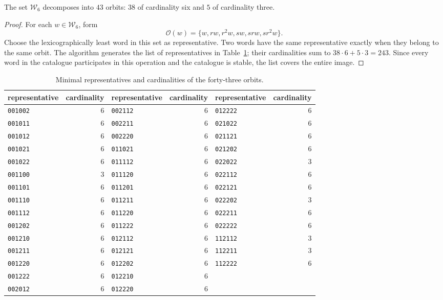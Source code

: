 \begin{proposition}
\label{act21:tpk:43}
The set \(\mathcal W_6\) decomposes into \(43\) orbits: \(38\) of
cardinality six and \(5\) of cardinality three.
\end{proposition}
\begin{proof}
For each \(w\in\mathcal W_6\), form
\[
 \mathcal O(w)=\{w,rw,r^2w,sw,srw,sr^2w\}.
\]
Choose the lexicographically least word in this set as representative.
Two words have the same representative exactly when they belong to the
same orbit. The algorithm generates the list of representatives in
Table~\ref{act21:tpk:representantes}; their cardinalities sum to
\(38\cdot6+5\cdot3=243\). Since every word in the catalogue participates
in this operation and the catalogue is stable, the list covers the
entire image.
\end{proof}

\begin{table}[htbp]
\caption{Minimal representatives and cardinalities of the forty-three orbits.}
\label{act21:tpk:representantes}
\small
\begin{tabular}{@{}lr@{\qquad}lr@{\qquad}lr@{}}
\toprule
representative&cardinality&representative&cardinality&representative&cardinality\\
\midrule
\texttt{001002}&6&\texttt{002112}&6&\texttt{012222}&6\\
\texttt{001011}&6&\texttt{002211}&6&\texttt{021022}&6\\
\texttt{001012}&6&\texttt{002220}&6&\texttt{021121}&6\\
\texttt{001021}&6&\texttt{011021}&6&\texttt{021202}&6\\
\texttt{001022}&6&\texttt{011112}&6&\texttt{022022}&3\\
\texttt{001100}&3&\texttt{011120}&6&\texttt{022112}&6\\
\texttt{001101}&6&\texttt{011201}&6&\texttt{022121}&6\\
\texttt{001110}&6&\texttt{011211}&6&\texttt{022202}&3\\
\texttt{001112}&6&\texttt{011220}&6&\texttt{022211}&6\\
\texttt{001202}&6&\texttt{011222}&6&\texttt{022222}&6\\
\texttt{001210}&6&\texttt{012112}&6&\texttt{112112}&3\\
\texttt{001211}&6&\texttt{012121}&6&\texttt{112211}&3\\
\texttt{001220}&6&\texttt{012202}&6&\texttt{112222}&6\\
\texttt{001222}&6&\texttt{012210}&6&&\\
\texttt{002012}&6&\texttt{012220}&6&&\\
\bottomrule
\end{tabular}
\end{table}

